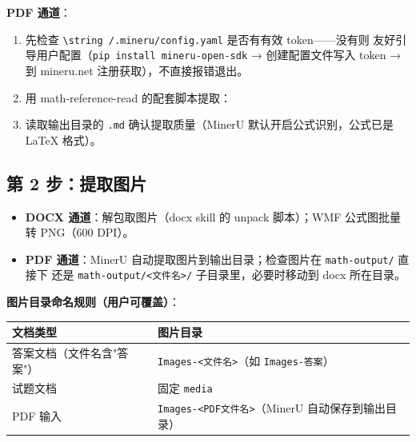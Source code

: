 \documentclass[11pt,a4paper]{ctexart}
\begin{document}
\textbf{PDF 通道}：

\begin{enumerate}
  \item 先检查 \texttt{\textbackslash string~/.mineru/config.yaml} 是否有有效 token——没有则
        友好引导用户配置（\texttt{pip install mineru-open-sdk} → 创建配置文件写入 token
        → 到 mineru.net 注册获取），不直接报错退出。
  \item 用 math-reference-read 的配套脚本提取：
\end{enumerate}


\begin{enumerate}
  \setcounter{enumi}{2}
  \item 读取输出目录的 \texttt{.md} 确认提取质量（MinerU 默认开启公式识别，公式已是 LaTeX 格式）。
\end{enumerate}

\subsection{第 2 步：提取图片}

\begin{itemize}
  \item \textbf{DOCX 通道}：解包取图片（docx skill 的 unpack 脚本）；WMF 公式图批量转 PNG（600 DPI）。
  \item \textbf{PDF 通道}：MinerU 自动提取图片到输出目录；检查图片在 \texttt{math-output/} 直接下
        还是 \texttt{math-output/<文件名>/} 子目录里，必要时移动到 docx 所在目录。
\end{itemize}

\textbf{图片目录命名规则（用户可覆盖）}：

\begin{center}
\begin{tabular}{ll}
\toprule
文档类型 & 图片目录 \\
\midrule
答案文档（文件名含"答案"） & \texttt{Images-<文件名>}（如 \texttt{Images-答案}） \\
试题文档 & 固定 \texttt{media} \\
PDF 输入 & \texttt{Images-<PDF文件名>}（MinerU 自动保存到输出目录） \\
\bottomrule
\end{tabular}
\end{center}
\end{document}
